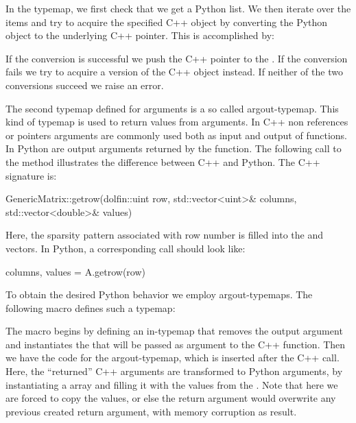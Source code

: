 In the typemap, we first check that we get a Python list. We then iterate
over the items and try to acquire the specified C++ object by converting
the Python object to the underlying C++ pointer. This is accomplished by:
If the conversion is successful we push the C++ pointer to
the . If the conversion fails we try to acquire a
 version of the C++ object instead. If neither of the
two conversions succeed we raise an error.

The second typemap defined for  arguments is a so
called argout-typemap. This kind of typemap is used to return values
from arguments. In C++ non  references or pointers
arguments are commonly used both as input and output of functions. In
Python are output arguments returned by the function. The following
call to the  method illustrates the
difference between C++ and Python. The C++ signature is:
\begin{swigcode}
GenericMatrix::getrow(dolfin::uint row, std::vector<uint>& columns, std::vector<double>& values)
\end{swigcode}
Here, the sparsity pattern associated with row number  is
filled into the  and  vectors.  In Python, a
corresponding call should look like:
\begin{python}
columns, values = A.getrow(row)
\end{python}
To obtain the desired Python behavior we employ argout-typemaps. The
following macro defines such a typemap:
The macro begins by defining an in-typemap that removes the output
argument and instantiates the  that will be passed as
argument to the C++ function. Then we have the code for the
argout-typemap, which is inserted after the C++ call. Here, the
``returned'' C++ arguments are transformed to Python arguments, by
instantiating a \numpy array  and filling it with the values
from the . Note that here we are forced to copy the
values, or else the return argument would overwrite any previous
created return argument, with memory corruption as result.

